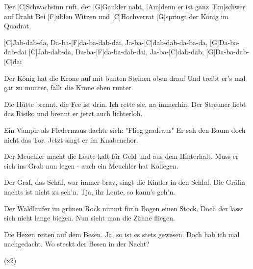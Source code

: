 

\begin{guitar}
	
	Der [C]Schwachsinn ruft, der [G]Gaukler naht, [Am]denn er ist ganz [Em]schwer auf Draht
	Bei [F]{ü}blen Witzen und [C]Hochverrat [G]springt der König im Quadrat.
	
	[C]Jab-dab-da, Da-ba-[F]da-ba-dab-dai, Ja-ba-[C]dab-dab-da-ba-da, [G]Da-ba-dab-dai
	[C]Jab-dab-da, Da-ba-[F]da-ba-dab-dai, Ja-ba-[C]dab-dab, [G]Da-ba-dab-[C]dai
	
	Der König hat die Krone auf mit bunten Steinen oben drauf
	Und treibt er's mal gar zu munter, fällt die Krone eben runter.
	
	 
	
	Die Hütte brennt, die Fee ist drin. Ich rette sie, na immerhin.
	Der Streuner liebt das Risiko und brennt er jetzt auch lichterloh.
	
	 
	
	Ein Vampir als Fledermaus dachte sich: "Flieg gradeaus"
	Er sah den Baum doch nicht das Tor. Jetzt singt er im Knabenchor.
	
	 
	
	Der Meuchler macht die Leute kalt für Geld und aus dem Hinterhalt.
	Muss er sich ins Grab nun legen - auch ein Meuchler hat Kollegen.
	
	 
	
	Der Graf, das Schaf, war immer brav, singt die Kinder in den Schlaf.
	Die Gräfin nachts ist nicht zu seh'n. Tja, ihr Leute, so kann's geh'n.
	
	 
	
	Der Waldläufer im grünen Rock nimmt für'n Bogen einen Stock.
	Doch der lässt sich nicht lange biegen. Nun sieht man die Zähne fliegen.
	
	 
	
	Die Hexen reiten auf dem Besen. Ja, so ist es stets gewesen.
	Doch hab ich mal nachgedacht. Wo steckt der Besen in der Nacht?
	
	  (x2)
	
\end{guitar}
